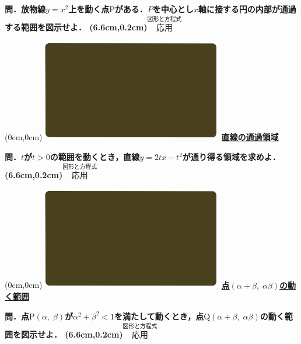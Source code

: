 \documentclass[10pt,
fleqn,
dvipdfmx,
uplatex
]{jsarticle}
\begin{document}
\LARGE 
\bf\boldmath 問．放物線$y=x^2$上を動く点$\text{P}$がある．$P$を中心とし$x$軸に接する円の内部が通過する範囲を図示せよ．
\at(6.6cm,0.2cm){\small\color{bradorange}$\overset{\text{図形と方程式}}{\text{応用}}$}


\newpage



\at(0cm,0cm){\includegraphics[width=8cm,bb=0 0 1920 1080]{./youtube/thumbnails/templates/smart_background/図形と方程式.jpeg}}
{\color{orange}\bf\boldmath\huge\underline{直線の通過領域}}\vspace{0.3zw}

\LARGE 
\bf\boldmath 問．$t$が$t>0$の範囲を動くとき，直線$y=2tx-t^2$が通り得る領域を求めよ．
\at(6.6cm,0.2cm){\small\color{bradorange}$\overset{\text{図形と方程式}}{\text{応用}}$}


\newpage



\at(0cm,0cm){\includegraphics[width=8cm,bb=0 0 1920 1080]{./youtube/thumbnails/templates/smart_background/図形と方程式.jpeg}}
{\color{orange}\bf\boldmath\LARGE\underline{点$\left(\alpha +\beta ,\;\alpha \beta \right)$の動く範囲}}\vspace{0.3zw}

\LARGE 
\bf\boldmath 問．点$\text{P}\left(\alpha ,\;\beta \right)$が$\alpha ^2+\beta ^2<1$を満たして動くとき，点$\text{Q}\left(\alpha +\beta ,\;\alpha \beta \right)$の動く範囲を図示せよ．
\at(6.6cm,0.2cm){\small\color{bradorange}$\overset{\text{図形と方程式}}{\text{応用}}$}


\newpage
\end{document}
